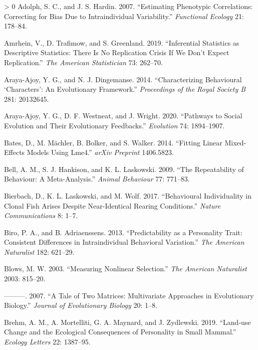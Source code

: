 \documentclass{article}
\newlength{\cslhangindent}
\newenvironment{CSLReferences}[3] %
 {%
  \setlength{\parindent}{0pt}
  \ifodd #1 \everypar{\setlength{\hangindent}{\cslhangindent}}\ignorespaces\fi
  \ifnum #2 > 0
  \setlength{\parskip}{#2\baselineskip}
  \fi
 }%
 {}
\begin{document}
\hypertarget{refs}{}
\begin{CSLReferences}{1}{0}
\leavevmode\hypertarget{ref-Adolf2007}{}%
Adolph, S. C., and J. S. Hardin. 2007. {``Estimating Phenotypic
Correlations: Correcting for Bias Due to Intraindividual Variability.''}
\emph{Functional Ecology} 21: 178--84.

\leavevmode\hypertarget{ref-Amrhein2019}{}%
Amrhein, V., D. Trafimow, and S. Greenland. 2019. {``Inferential
Statistics as Descriptive Statistics: There Is No Replication Crisis If
We Don't Expect Replication.''} \emph{The American Statistician} 73:
262--70.

\leavevmode\hypertarget{ref-Araya2014}{}%
Araya-Ajoy, Y. G., and N. J. Dingemanse. 2014. {``Characterizing
Behavioural {`Characters'}: An Evolutionary Framework.''}
\emph{Proceedings of the Royal Society B} 281: 20132645.

\leavevmode\hypertarget{ref-Araya2020}{}%
Araya-Ajoy, Y. G., D. F. Westneat, and J. Wright. 2020. {``Pathways to
Social Evolution and Their Evolutionary Feedbacks.''} \emph{Evolution}
74: 1894--1907.

\leavevmode\hypertarget{ref-Bates2014}{}%
Bates, D., M. Mächler, B. Bolker, and S. Walker. 2014. {``Fitting Linear
Mixed-Effects Models Using Lme4.''} \emph{arXiv Preprint} 1406.5823.

\leavevmode\hypertarget{ref-Bell2009}{}%
Bell, A. M., S. J. Hankison, and K. L. Laskowski. 2009. {``The
Repeatability of Behaviour: A Meta-Analysis.''} \emph{Animal Behaviour}
77: 771--83.

\leavevmode\hypertarget{ref-Bierbach2017}{}%
Bierbach, D., K. L. Laskowski, and M. Wolf. 2017. {``Behavioural
Individuality in Clonal Fish Arises Despite Near-Identical Rearing
Conditions.''} \emph{Nature Communications} 8: 1--7.

\leavevmode\hypertarget{ref-Biro2013}{}%
Biro, P. A., and B. Adriaenssens. 2013. {``Predictability as a
Personality Trait: Consistent Differences in Intraindividual Behavioral
Variation.''} \emph{The American Naturalist} 182: 621--29.

\leavevmode\hypertarget{ref-Blows2003}{}%
Blows, M. W. 2003. {``Measuring Nonlinear Selection.''} \emph{The
American Naturalist} 2003: 815--20.

\leavevmode\hypertarget{ref-Blows2007}{}%
---------. 2007. {``A Tale of Two Matrices: Multivariate Approaches in
Evolutionary Biology.''} \emph{Journal of Evolutionary Biology} 20:
1--8.

\leavevmode\hypertarget{ref-Brehm2019}{}%
Brehm, A. M., A. Mortelliti, G. A. Maynard, and J. Zydlewski. 2019.
{``Land‐use Change and the Ecological Consequences of Personality in
Small Mammal.''} \emph{Ecology Letters} 22: 1387--95.


\end{CSLReferences}
\end{document}
